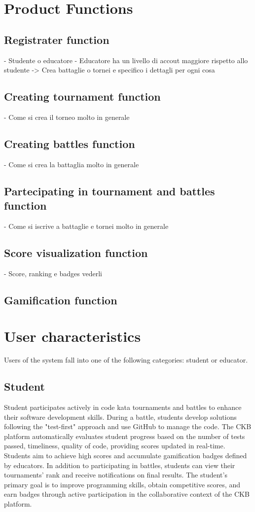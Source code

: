 {\color{orange}
\section{Product Functions}
\subsection{Registrater function}
- Studente o educatore
- Educatore ha un livello di accout maggiore rispetto allo studente -> Crea battaglie o tornei e specifico i dettagli per ogni cosa

\subsection{Creating tournament function}
- Come si crea il torneo molto in generale

\subsection{Creating battles function}
- Come si crea la battaglia molto in generale

\subsection{Partecipating in tournament and battles function}
- Come si iscrive a battaglie e tornei molto in generale

\subsection{Score visualization function}
- Score, ranking e badges vederli

\subsection{Gamification function}

\section{User characteristics}
Users of the system fall into one of the following categories: student or educator.
}

\subsection*{Student}
Student participates actively in code kata tournaments and battles to enhance their software development skills. 
During a battle, students develop solutions following the "test-first" approach and use GitHub to manage the code. 
The CKB platform automatically evaluates student progress based on the number of tests passed, timeliness, quality of code, providing scores updated in real-time. 
Students aim to achieve high scores and accumulate gamification badges defined by educators. 
In addition to participating in battles, students can view their tournaments' rank and receive notifications on final results. 
The student's primary goal is to improve programming skills, obtain competitive scores, and earn badges through active participation in the collaborative context of the CKB platform.

